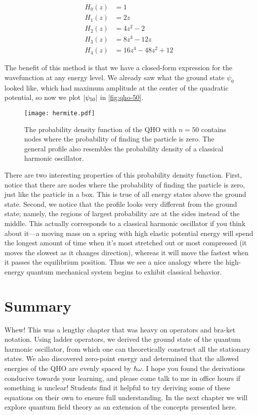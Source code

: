 \begin{align*}
	H_0(z) &= 1 \\
	H_1(z) &= 2z \\
	H_2(z) &= 4z^2-2 \\
	H_3(z) &= 8z^3 - 12z \\
	H_4(z) &= 16z^4 - 48z^2 + 12
\end{align*}

The benefit of this method is that we have a closed-form expression for the wavefunction at any energy level. 
We already saw what the ground state $\psi_0$ looked like, which had maximum amplitude at the center of the quadratic potential, so now we plot $\abs{\psi_{50}}$ in \autoref{fig:qho-50}.

\begin{figure}[!h]
	\centering
	\texttt{[image: hermite.pdf]}
	\caption{The probability density function of the QHO with $n = 50$ contains nodes where the probability of finding the particle is zero. 
	The general profile also resembles the probability density of a classical harmonic oscillator.}
	\label{fig:qho-50}
\end{figure}

There are two interesting properties of this probability density function. 
First, notice that there are nodes where the probability of finding the particle is zero, just like the particle in a box. 
This is true of all energy states above the ground state. 
Second, we notice that the profile looks very different from the ground state; namely, the regions of largest probability are at the sides instead of the middle. 
This actually corresponds to a classical harmonic oscillator if you think about it---a moving mass on a spring with high elastic potential energy will spend the longest amount of time when it's most stretched out or most compressed (it moves the slowest as it changes direction), whereas it will move the fastest when it passes the equilibrium position. 
Thus we see a nice analogy where the high-energy quantum mechanical system begins to exhibit classical behavior.


\section{Summary}

Whew! This was a lengthy chapter that was heavy on operators and bra-ket notation. 
Using ladder operators, we derived the ground state of the quantum harmonic oscillator, from which one can theoretically construct all the stationary states. 
We also discovered zero-point energy and determined that the allowed energies of the QHO are evenly spaced by $\hbar\omega$. 
I hope you found the derivations conducive towards your learning, and please come talk to me in office hours if something is unclear! 
Students find it helpful to try deriving some of these equations on their own to ensure full understanding. 
In the next chapter we will explore quantum field theory as an extension of the concepts presented here.

%